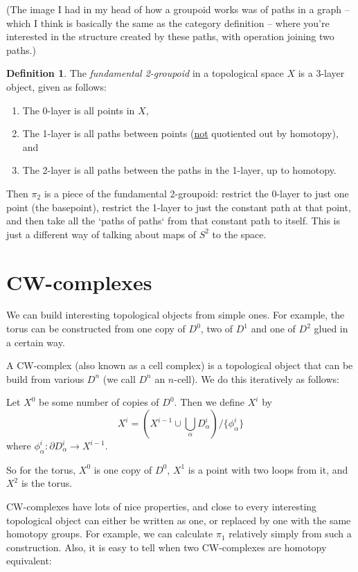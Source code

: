 \documentclass[a4paper,12pt]{article}
\newcommand{\del}{\partial}
\theoremstyle{definition}
\newtheorem*{defn}{Definition}
\begin{document}
(The image I had in my head of how a groupoid works was of paths in a graph -- which I think is basically the same as the category definition -- where you're interested in the structure created by these paths, with operation joining two paths.)

\begin{defn}
The \emph{fundamental 2-groupoid} in a topological space $X$ is a 3-layer object, given as follows:
\begin{enumerate}[start=0]
\item The 0-layer is all points in $X$,
\item The 1-layer is all paths between points (\underline{not} quotiented out by homotopy), and
\item The 2-layer is all paths between the paths in the 1-layer, up to homotopy.
\end{enumerate}
\end{defn}

Then $\pi_2$ is a piece of the fundamental 2-groupoid: restrict the 0-layer to just one point (the basepoint), restrict the 1-layer to just the constant path at that point, and then take all the `paths of paths` from that constant path to itself. This is just a different way of talking about maps of $S^2$ to the space.

\section{CW-complexes}

We can build interesting topological objects from simple ones.
For example, the torus can be constructed from one copy of $D^0$, two of $D^1$ and one of $D^2$ glued in a certain way.

A CW-complex (also known as a cell complex) is a topological object that can be build from various $D^n$ (we call $D^n$ an $n$-cell).
We do this iteratively as follows:

Let $X^0$ be some number of copies of $D^0$.
Then we define $X^i$ by
$$X^i = (X^{i-1}\cup \bigcup_{\alpha} D_{\alpha}^i)/\{\phi_\alpha^i\}$$
where $\phi_\alpha^i: \del D_\alpha^i\to X^{i-1}$.

So for the torus, $X^0$ is one copy of $D^0$, $X^1$ is a point with two loops from it, and $X^2$ is the torus.

CW-complexes have lots of nice properties, and close to every interesting topological object can either be written as one, or replaced by one with the same homotopy groups.
For example, we can calculate $\pi_1$ relatively simply from such a construction.
Also, it is easy to tell when two CW-complexes are homotopy equivalent:
\end{document}

